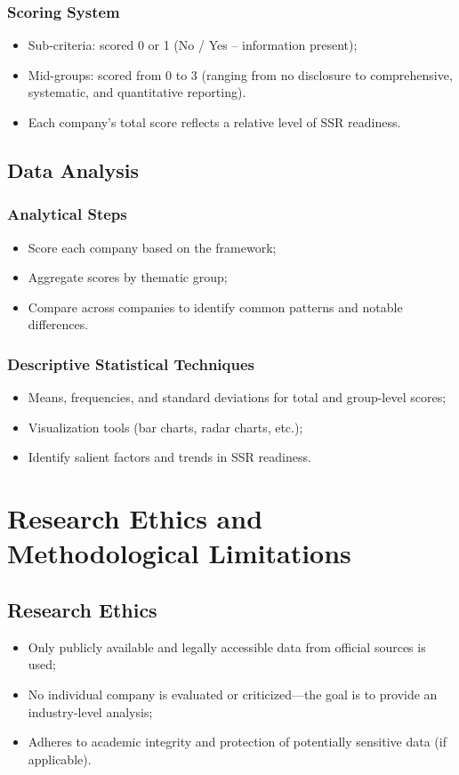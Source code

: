 \subsubsection{Scoring System}
\begin{itemize}
    \item Sub-criteria: scored 0 or 1 (No / Yes -- information present);
    \item Mid-groups: scored from 0 to 3 (ranging from no disclosure to comprehensive, systematic, and quantitative reporting).
    \item Each company’s total score reflects a relative level of SSR readiness.
\end{itemize}

\subsection{Data Analysis}
\subsubsection{Analytical Steps}
\begin{itemize}
    \item Score each company based on the framework;
    \item Aggregate scores by thematic group;
    \item Compare across companies to identify common patterns and notable differences.
\end{itemize}

\subsubsection{Descriptive Statistical Techniques}
\begin{itemize}
    \item Means, frequencies, and standard deviations for total and group-level scores;
    \item Visualization tools (bar charts, radar charts, etc.);
    \item Identify salient factors and trends in SSR readiness.
\end{itemize}

\section{Research Ethics and Methodological Limitations}
\subsection{Research Ethics}
\begin{itemize}
    \item Only publicly available and legally accessible data from official sources is used;
    \item No individual company is evaluated or criticized---the goal is to provide an industry-level analysis;
    \item Adheres to academic integrity and protection of potentially sensitive data (if applicable).
\end{itemize}

